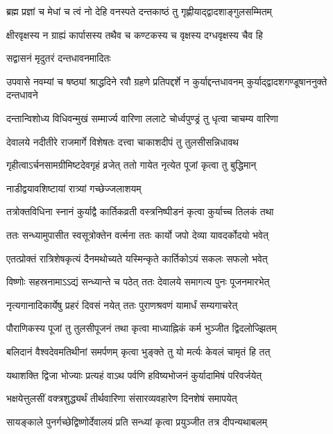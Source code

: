\twolineshloka
{ब्रह्म प्रज्ञां च मेधां च त्वं नो देहि वनस्पते}
{दन्तकाष्ठं तु गृह्णीयाद्द्वादशाङ्गुलसम्मितम्} %

\twolineshloka
{क्षीरवृक्षस्य न ग्राह्यं कार्पासस्य तथैव च}
{कण्टकस्य च वृक्षस्य दग्धवृक्षस्य चैव हि} %


\onelineshloka
{सद्वासनं मृदुतरं दन्तधावनमादितः} %

\threelineshloka
{उपवासे नवम्यां च षष्ठ्यां श्राद्धदिने रवौ}
{ग्रहणे प्रतिपद्दर्शे न कुर्याद्दन्तधावनम्}
{कुर्याद्द्वादशगण्डूषाननुक्ते दन्तधावने} %

\twolineshloka
{दन्तान्विशोध्य विधिवन्मुखं सम्मार्ज्य वारिणा}
{ललाटे चोर्ध्वपुण्ड्रं तु धृत्वा चाचम्य वारिणा} %

\twolineshloka
{देवालये नदीतीरे राजमार्गे विशेषतः}
{दत्त्वा चाकाशदीपं तु तुलसीसन्निधावथ} %

\twolineshloka
{गृहीत्वाऽर्चनसामग्रीमिष्टदेवगृहं व्रजेत्}
{ततो गायेत नृत्येत पूजां कृत्वा तु बुद्धिमान्} %



\onelineshloka
{नाडीद्वयावशिष्टायां रात्र्यां गच्छेज्जलाशयम्} %

\twolineshloka
{तत्रोक्तविधिना स्नानं कुर्याद्वै कार्तिकव्रती}
{वस्त्रनिष्पीडनं कृत्वा कुर्याच्च तिलकं तथा} %

\twolineshloka
{ततः सन्ध्यामुपासीत स्वसूत्रोक्तेन वर्त्मना}
{ततः कार्यो जपो देव्या यावदर्कोदयो भवेत्} %

\twolineshloka
{एतत्प्रोक्तं रात्रिशेषकृत्यं दैनमथोच्यते}
{यस्मिन्कृते कार्तिकोऽयं सकलः सफलो भवेत्} %

\twolineshloka
{विष्णोः सहस्रनामाऽऽद्यं सन्ध्यान्ते च पठेत् ततः}
{देवालये समागत्य पुनः पूजनमारभेत्} %

\twolineshloka
{नृत्यगानादिकार्येषु प्रहरं दिवसं नयेत्}
{ततः पुराणश्रवणं यामार्धं सम्यगाचरेत्} %

\twolineshloka
{पौराणिकस्य पूजां तु तुलसीपूजनं तथा}
{कृत्वा माध्याह्निकं कर्म भुञ्जीत द्विदलोज्झितम्} %

\twolineshloka
{बलिदानं वैश्वदेवमतिथीनां समर्पणम्}
{कृत्वा भुङ्क्ते तु यो मर्त्यः केवलं चामृतं हि तत्} %

\twolineshloka
{यथाशक्ति द्विजा भोज्याः प्रत्यहं वाऽथ पर्वणि}
{हविष्यभोजनं कुर्यादामिषं परिवर्जयेत्} %

\twolineshloka
{भक्षयेत्तुलसीं वक्त्रशुद्ध्यर्थं तीर्थवारिणा}
{संसारव्यवहारेण दिनशेषं समापयेत्} %

\twolineshloka
{सायङ्काले पुनर्गच्छेद्विष्णोर्देवालयं प्रति}
{सन्ध्यां कृत्वा प्रयुञ्जीत तत्र दीपन्यथाबलम्} %

